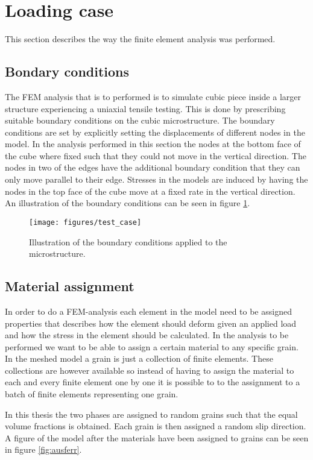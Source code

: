 \documentclass[crystal_plast.tex]{subfiles}
\begin{document}
\section{Loading case}

This section describes the way the finite element analysis was performed.


\subsection{Bondary conditions}
The FEM analysis that is to performed is to simulate cubic piece inside a larger structure experiencing a uniaxial tensile testing. This is done by prescribing suitable boundary conditions on the cubic microstructure. The boundary conditions are set by explicitly setting the displacements of different nodes in the model. In the analysis performed in this section the nodes at the bottom face of the cube where fixed such that they could not move in the vertical direction. The nodes in two of the edges have the additional boundary condition that they can only move parallel to their edge. Stresses in the models are induced by having the nodes in the top face of the cube move at a fixed rate in the vertical direction. An illustration of the boundary conditions can be seen in figure \ref{fig:test_case}. 


\begin{figure}[ht]
\centering
\texttt{[image: figures/test\_case]}
\caption{Illustration of the boundary conditions applied to the microstructure.}
\label{fig:test_case}
\end{figure}

\subsection{Material assignment}

In order to do a FEM-analysis each element in the model need to be assigned properties that describes how the element should deform given an applied load and how the stress in the element should be calculated. In the analysis to be performed we want to be able to assign a certain material to any specific grain. In the meshed model a grain is just a collection of finite elements. These collections are however available so instead of having to assign the material to each and every finite element one by one it is possible to to the assignment to a batch of finite elements representing one grain.

In this thesis the two phases are assigned to random grains such that the equal volume fractions is obtained. Each grain is then assigned a random slip direction. A figure of the model after the materials have been assigned to grains can be seen in figure \ref{fig:ausferr}. 
\end{document}
